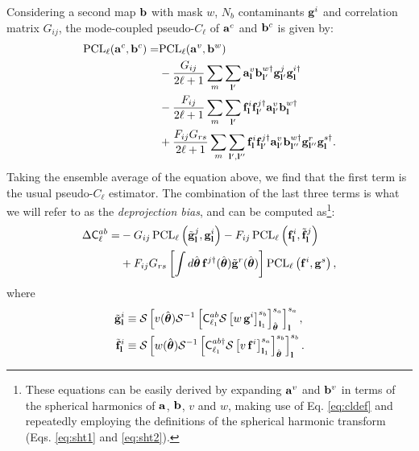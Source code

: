 \documentclass[usenatbib]{mnrasb}
\newcommand{\nv}{\hat{\boldsymbol{\theta}}}
\begin{document}
      Considering a second map ${\bf b}$ with mask $w$, $N_b$ contaminants ${\bf g}^i$ and correlation matrix $G_{ij}$, the mode-coupled pseudo-$C_\ell$ of ${\bf a}^c$ and ${\bf b}^c$ is given by:
      \begin{align}\nonumber
        {\rm PCL}_\ell({\bf a}^c,{\bf b}^c)=&{\rm PCL}_\ell({\bf a}^v,{\bf b}^w)\\\nonumber
        &-\frac{G_{ij}}{2\ell+1}\sum_m\sum_{{\bf l}'}{\bf a}^v_{\bf l}{\bf b}^{w\dag}_{{\bf l}'}{\bf g}^j_{{\bf l}'}{\bf g}^{i\dag}_{\bf l}\\\nonumber
        &-\frac{F_{ij}}{2\ell+1}\sum_m\sum_{{\bf l}'}{\bf f}^i_{\bf l}{\bf f}^{j\dag}_{{\bf l}'}{\bf a}^v_{{\bf l}'}{\bf b}^{w\dag}_{\bf l}\\\label{eq:dpbias0}
        &+\frac{F_{ij}G_{rs}}{2\ell+1}\sum_m\sum_{{\bf l}',{\bf l}''}{\bf f}^i_{\bf l}{\bf f}^{j\dag}_{{\bf l}'}{\bf a}^v_{{\bf l}'}{\bf b}^{w\dag}_{{\bf l}''}{\bf g}^r_{{\bf l}''}{\bf g}^{s\dag}_{\bf l}.
      \end{align}
      Taking the ensemble average of the equation above, we find that the first term is the usual pseudo-$C_\ell$ estimator. The combination of the last three terms is what we will refer to as the \emph{deprojection bias}, and can be computed as\footnote{These equations can be easily derived by expanding ${\bf a}^v$ and ${\bf b}^v$ in terms of the spherical harmonics of ${\bf a}$, ${\bf b}$, $v$ and $w$, making use of Eq. \ref{eq:cldef} and repeatedly employing the definitions of the spherical harmonic transform (Eqs. \ref{eq:sht1} and \ref{eq:sht2}).}:
      \begin{align}\nonumber
        \Delta {\sf C}^{ab}_\ell=&-G_{ij}\,{\rm PCL}_\ell\left(\tilde{\bf g}^j_{\bf l},{\bf g}^i_{\bf l}\right)-F_{ij}\,{\rm PCL}_\ell\left({\bf f}^i_{\bf l},\tilde{\bf f}^j_{\bf l}\right)\\\label{eq:dpbias}
        &+F_{ij}G_{rs}\left[\int d\nv\,{\bf f}^{j\dag}(\nv)\tilde{\bf g}^r(\nv)\right]{\rm PCL}_\ell\left({\bf f}^{i},{\bf g}^s\right),
      \end{align}
      where
      \begin{align}\label{eq:dp.g.aux}
        \tilde{\bf g}^i_{\bf l}&\equiv{\cal S}\left[v(\nv){\cal S}^{-1}\left[{\sf C}^{ab}_{\ell_1}{\cal S}\left[w\,{\bf g}^i\right]^{s_b}_{{\bf l}_1}\right]^{s_a}_{\nv}\right]^{s_a}_{\bf l},\\\label{eq:dp.f.aux}
        \tilde{\bf f}^i_{\bf l}&\equiv{\cal S}\left[w(\nv){\cal S}^{-1}\left[{\sf C}^{ab\dag}_{\ell_1}{\cal S}\left[v\,{\bf f}^i\right]^{s_a}_{{\bf l}_1}\right]^{s_b}_{\nv}\right]^{s_b}_{\bf l}.
      \end{align}
      
\end{document}
